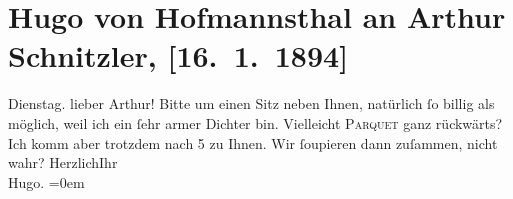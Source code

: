 

         
         \renewcommand{\erwaehntePersonen}{Personen: Hugo von Hofmannsthal}
         \renewcommand{\erwaehnteOrte}{Orte: Wien}
         \renewcommand{\erwaehnteWerke}{}
               \section[Hugo von Hofmannsthal an Arthur Schnitzler, {[}16. 1. 1894{]}]{ Hugo von Hofmannsthal an Arthur Schnitzler, {[}16. 1. 1894{]}}\nopagebreak{}\rehead{ }\begin{ledgroupsized}[t]{13cm}\normalsize\beginnumbering{} \toendnotes[C]{\smallbreak\pagebreak[2]} 
\pstart
           \raggedleft{}{\pb}Dienstag.\pend
           \pstart{}lieber Arthur!\pend\pstart
           Bitte um einen Sitz neben Ihnen, natürlich ſo billig als möglich, weil ich ein ſehr
               armer Dichter bin. Vielleicht \textsc{Parquet} ganz rückwärts? Ich
               komm aber trotzdem nach 5 zu Ihnen. Wir ſoupieren {\pb}dann zuſammen, nicht wahr?\pend
           \pstart
           Herzlich\hspace*{3.5em}Ihr{\\[\baselineskip]}\spacefill\mbox{Hugo.}\pend
           \leftskip=0em{}
         
         \endnumbering{}\end{ledgroupsized}  \newcommand{\dateiname}{L00293}\newcommand{\titel}{Hugo von Hofmannsthal an Arthur Schnitzler, [16. 1. 1894]}\newcommand{\editorInnen}{Martin Anton Müller und Gerd-Hermann Susen}
      